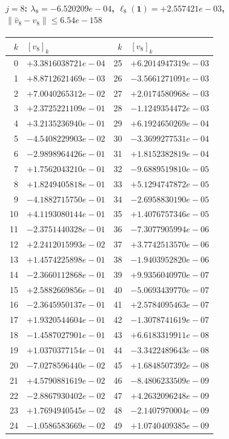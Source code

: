 \documentclass[11pt]{article}
\begin{document}
\paragraph{$j = 8$: $\lambda_{8} = -6.520209e-04$, \quad $\ell_{8}(\mathbf{1}) = +2.557421e-03$, \quad $\|\hat v_{8} - v_{8}\| \leq 6.54e-158$}
\begin{center}
{\footnotesize
\begin{tabular}{r@{\;\;}l@{\quad}r@{\;\;}l}
\toprule
$k$ & $[v_{8}]_k$ & $k$ & $[v_{8}]_k$ \\
\midrule
0 & $+3.3816038721e-04$ & 25 & $+6.2014947319e-03$ \\
1 & $+8.8712621469e-03$ & 26 & $-3.5661271091e-03$ \\
2 & $+7.0040265312e-02$ & 27 & $+2.0174580968e-03$ \\
3 & $+2.3725221109e-01$ & 28 & $-1.1249354472e-03$ \\
4 & $+3.2135236940e-01$ & 29 & $+6.1924650269e-04$ \\
5 & $-4.5408229903e-02$ & 30 & $-3.3699277531e-04$ \\
6 & $-2.9898964426e-01$ & 31 & $+1.8152382819e-04$ \\
7 & $+1.7562043210e-01$ & 32 & $-9.6889519810e-05$ \\
8 & $+1.8249405818e-01$ & 33 & $+5.1294747872e-05$ \\
9 & $-4.1882715750e-01$ & 34 & $-2.6958830190e-05$ \\
10 & $+4.1193080144e-01$ & 35 & $+1.4076757346e-05$ \\
11 & $-2.3751440328e-01$ & 36 & $-7.3077905994e-06$ \\
12 & $+2.2412015993e-02$ & 37 & $+3.7742513570e-06$ \\
13 & $+1.4574225898e-01$ & 38 & $-1.9403952820e-06$ \\
14 & $-2.3660112868e-01$ & 39 & $+9.9356040970e-07$ \\
15 & $+2.5882669856e-01$ & 40 & $-5.0693439770e-07$ \\
16 & $-2.3645950137e-01$ & 41 & $+2.5784095463e-07$ \\
17 & $+1.9320544604e-01$ & 42 & $-1.3078741619e-07$ \\
18 & $-1.4587027901e-01$ & 43 & $+6.6183319911e-08$ \\
19 & $+1.0370377154e-01$ & 44 & $-3.3422489643e-08$ \\
20 & $-7.0278596440e-02$ & 45 & $+1.6848507392e-08$ \\
21 & $+4.5790881619e-02$ & 46 & $-8.4806233509e-09$ \\
22 & $-2.8867930402e-02$ & 47 & $+4.2632096248e-09$ \\
23 & $+1.7694940545e-02$ & 48 & $-2.1407970004e-09$ \\
24 & $-1.0586583669e-02$ & 49 & $+1.0740409385e-09$ \\
\bottomrule
\end{tabular}
}
\end{center}
\end{document}
